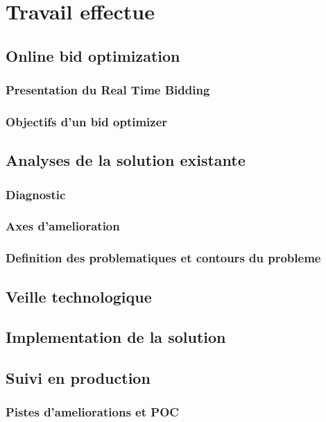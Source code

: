 \section{Travail effectue}
    \subsection{Online bid optimization}
        \subsubsection{Presentation du Real Time Bidding}
        \subsubsection{Objectifs d'un bid optimizer}
    \subsection{Analyses de la solution existante}
        \subsubsection{Diagnostic}
        \subsubsection{Axes d'amelioration}
        \subsubsection{Definition des problematiques et contours du probleme}
    \subsection{Veille technologique}
    \subsection{Implementation de la solution}
    \subsection{Suivi en production}
    \subsubsection{Pistes d'ameliorations et POC}        
